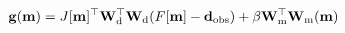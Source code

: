 \begin{equation}
\mathbf{g}(\mathbf{m})=
    J[\mathbf{m}]^\top \mathbf{W}_{\rm d}^\top \mathbf{W}_{\rm d}(F[\mathbf{m}]-\mathbf{d}_{\rm obs})
    + \beta \mathbf{W}_{\rm m}^\top \mathbf{W}_{\rm m} (\mathbf{m})
\label{eq:objective_function_gradient}
\end{equation}
